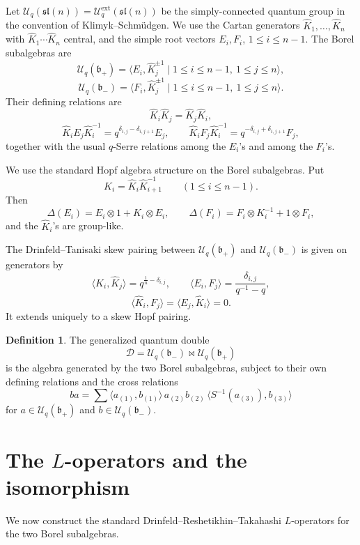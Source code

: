 \documentclass{article}
\theoremstyle{definition}
\newtheorem{definition}{Definition}
\newcommand{\Uc}{\mathcal{U}}
\newcommand{\fD}{\mathcal{D}}
\newcommand{\bipr}{\bowtie}
\newcommand{\la}{\langle}
\newcommand{\ra}{\rangle}
\newcommand{\Khat}{\widehat K}
\newcommand{\q}{q}
\begin{document}
Let $\Uc_q(\mathfrak{sl}(n))=\Uc_q^{\mathrm{ext}}(\mathfrak{sl}(n))$
be the simply-connected quantum group in the convention of
Klimyk--Schm\"udgen. We use the Cartan generators $\Khat_1,\dots,\Khat_n$
with $\Khat_1\cdots \Khat_n$ central, and the simple root vectors
$E_i,F_i$, $1\leq i\leq n-1$. The Borel subalgebras are
\[
\Uc_q(\mathfrak{b}_+)=\bigl\la E_i,\Khat_j^{\pm 1}\mid
1\leq i\leq n-1,\ 1\leq j\leq n\bigr\ra,
\]
\[
\Uc_q(\mathfrak{b}_-)=\bigl\la F_i,\Khat_j^{\pm 1}\mid
1\leq i\leq n-1,\ 1\leq j\leq n\bigr\ra.
\]
Their defining relations are
\[
\Khat_i\Khat_j=\Khat_j\Khat_i,
\]
\[
\Khat_i E_j\Khat_i^{-1}=\q^{\delta_{i,j}-\delta_{i,j+1}}E_j,
\qquad
\Khat_i F_j\Khat_i^{-1}=\q^{-\delta_{i,j}+\delta_{i,j+1}}F_j,
\]
together with the usual $q$-Serre relations among the $E_i$'s and
among the $F_i$'s.

We use the standard Hopf algebra structure on the Borel subalgebras.
Put
\[
K_i=\Khat_i\Khat_{i+1}^{-1}\qquad (1\leq i\leq n-1).
\]
Then
\[
\Delta(E_i)=E_i\otimes 1+K_i\otimes E_i,
\qquad
\Delta(F_i)=F_i\otimes K_i^{-1}+1\otimes F_i,
\]
and the $\Khat_i$'s are group-like.

The Drinfeld--Tanisaki skew pairing between
$\Uc_q(\mathfrak{b}_+)$ and $\Uc_q(\mathfrak{b}_-)$ is given on
generators by
\[
\la \Khat_i,\Khat_j\ra=\q^{\frac1n-\delta_{i,j}},
\qquad
\la E_i,F_j\ra=\frac{\delta_{i,j}}{\q^{-1}-\q},
\]
\[
\la \Khat_i,F_j\ra=\la E_j,\Khat_i\ra=0.
\]
It extends uniquely to a skew Hopf pairing.

\begin{definition}
The generalized quantum double
\[
\fD=\Uc_q(\mathfrak{b}_-)\bipr\Uc_q(\mathfrak{b}_+)
\]
is the algebra generated by the two Borel subalgebras, subject to their
own defining relations and the cross relations
\begin{equation}
  b a=\sum \la a_{(1)},b_{(1)}\ra\, a_{(2)}b_{(2)}\,
  \la S^{-1}(a_{(3)}),b_{(3)}\ra
  \tag{D}
\end{equation}
for $a\in \Uc_q(\mathfrak{b}_+)$ and $b\in\Uc_q(\mathfrak{b}_-)$.
\end{definition}

\section{The $L$-operators and the isomorphism}

We now construct the standard Drinfeld--Reshetikhin--Takahashi
$L$-operators for the two Borel subalgebras.
\end{document}
